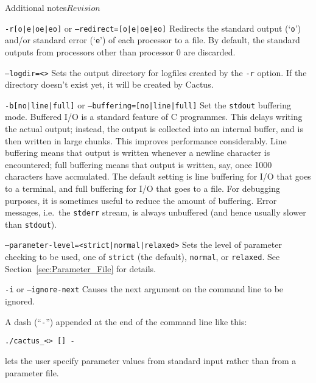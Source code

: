 \begin{cactuspart}{Additional notes}{}{$Revision$}
\begin{Lentry}
\item [\texttt{-r[o|e|oe|eo]} or \texttt{--redirect=[o|e|oe|eo]}]
Redirects the standard output (`\texttt{o}') and/or standard error
(`\texttt{e}') of each processor to a file.  By default,
the standard outputs from processors other than processor 0 are discarded.

\item [\texttt{--logdir=<\var{directory}>}]
Sets the output directory for logfiles created by the \texttt{-r} option.
If the directory doesn't exist yet, it will be created by Cactus.

\item [\texttt{-b[no|line|full]} or \texttt{--buffering=[no|line|full]}]
  Set the \texttt{stdout} buffering mode.  Buffered I/O is a
  standard feature of C programmes.  This delays writing the actual
  output; instead, the output is collected into an internal buffer,
  and is then written in large chunks.  This improves performance
  considerably.  Line buffering means that output is written whenever
  a newline character is encountered; full buffering means that output
  is written, say, once 1000 characters have accmulated.  The default
  setting is line buffering for I/O that goes to a terminal, and full
  buffering for I/O that goes to a file.  For debugging purposes, it
  is sometimes useful to reduce the amount of buffering.  Error
  messages, i.e.\ the \texttt{stderr} stream, is always unbuffered
  (and hence usually slower than \texttt{stdout}).

\item [\texttt{--parameter-level=<strict|normal|relaxed>}]
Sets the level of parameter checking to be used, one of \texttt{strict}
(the default), \texttt{normal}, or \texttt{relaxed}.
See Section~\ref{sec:Parameter_File} for details.

\item [\texttt{-i} or \texttt{--ignore-next}]
Causes the next argument on the command line to be ignored.
\end{Lentry}

A dash (``\texttt{-}'') appended at the end of the command line like this:

\texttt{./cactus\_<> [] -}

lets the user specify parameter values from standard input rather than
from a parameter file.



\end{cactuspart}
